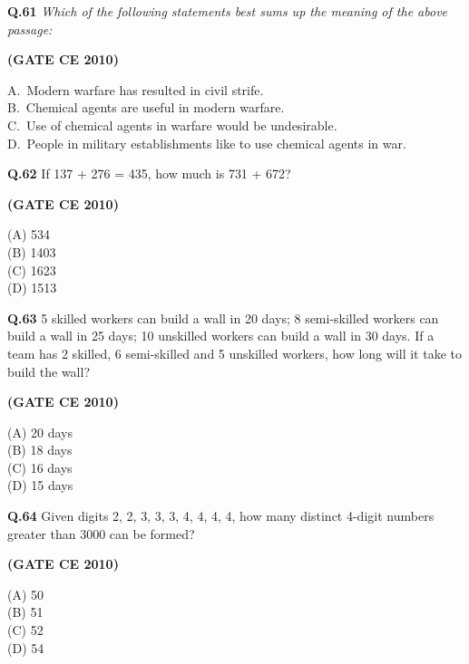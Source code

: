 \documentclass[journal,12pt,onecolumn]{exam}
\theoremstyle{remark}
\begin{document}
\begin{flushleft}
\vspace{0.3cm}
\noindent\textbf{Q.61}\noindent\textit{ Which of the following statements best sums up the meaning of the above passage:}

\hfill\textbf{(GATE CE 2010)}

A.\ Modern warfare has resulted in civil strife. \\
B.\ Chemical agents are useful in modern warfare.\\
C.\ Use of chemical agents in warfare would be undesirable. \\
D.\ People in military establishments like to use chemical agents in war.

\noindent\textbf{Q.62} If 137 + 276 = 435, how much is 731 + 672?

\hfill\textbf{(GATE CE 2010)}

\begin{multicols}{4}
\noindent(A) 534\\
(B) 1403\\
(C) 1623\\
(D) 1513
\end{multicols}

\setlength{\parskip}{0.5cm}

\noindent\textbf{Q.63} 5 skilled workers can build a wall in 20 days; 8 semi-skilled workers can build a wall in 25 days; 10 unskilled workers can build a wall in 30 days. If a team has 2 skilled, 6 semi-skilled and 5 unskilled workers, how long will it take to build the wall?

\hfill\textbf{(GATE CE 2010)}

\begin{multicols}{4}
\noindent(A) 20 days\\
(B) 18 days\\
(C) 16 days\\
(D) 15 days
\end{multicols}

\setlength{\parskip}{0.5cm}

\noindent\textbf{Q.64} Given digits 2, 2, 3, 3, 3, 4, 4, 4, 4, how many distinct 4-digit numbers greater than 3000 can be formed?

\hfill\textbf{(GATE CE 2010)}

\begin{multicols}{4}
\noindent(A) 50\\
(B) 51\\
(C) 52\\
(D) 54
\end{multicols}


\end{flushleft}
\end{document}

